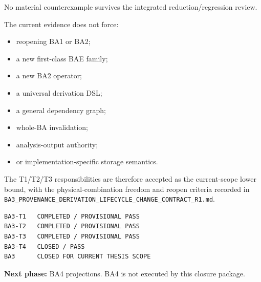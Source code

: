 \documentclass[11pt,a4paper]{article}
\providecommand{\tightlist}{\setlength{\itemsep}{0pt}\setlength{\parskip}{0pt}}
\begin{document}
No material counterexample survives the integrated reduction/regression review.

The current evidence does not force:

\begin{itemize}
\tightlist
\item
  reopening BA1 or BA2;
\item
  a new first-class BAE family;
\item
  a new BA2 operator;
\item
  a universal derivation DSL;
\item
  a general dependency graph;
\item
  whole-BA invalidation;
\item
  analysis-output authority;
\item
  or implementation-specific storage semantics.
\end{itemize}

The T1/T2/T3 responsibilities are therefore accepted as the current-scope lower bound, with the physical-combination freedom and reopen criteria recorded in \texttt{BA3\_PROVENANCE\_DERIVATION\_LIFECYCLE\_CHANGE\_CONTRACT\_R1.md}.

\begin{verbatim}
BA3-T1   COMPLETED / PROVISIONAL PASS
BA3-T2   COMPLETED / PROVISIONAL PASS
BA3-T3   COMPLETED / PROVISIONAL PASS
BA3-T4   CLOSED / PASS
BA3      CLOSED FOR CURRENT THESIS SCOPE
\end{verbatim}

\textbf{Next phase:} BA4 projections. BA4 is not executed by this closure package.
\end{document}
